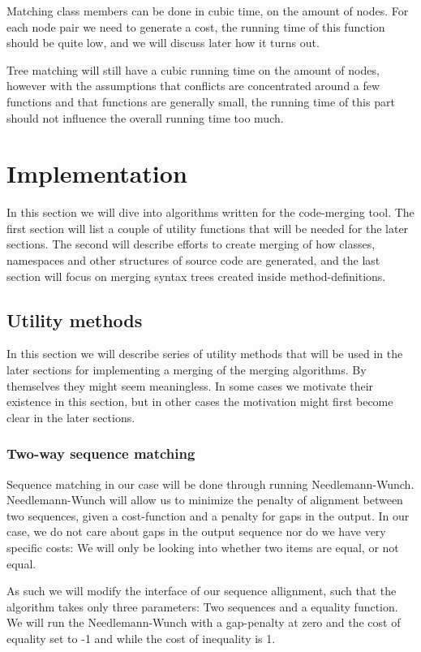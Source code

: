 \documentclass[11pt]{article}
\begin{document}
Matching class members can be done in cubic time, on the amount of nodes. For each node pair we need to generate a cost, the running time of this function should be quite low, and we will discuss later how it turns out. 

Tree matching will still have a cubic running time on the amount of nodes, however with the assumptions that conflicts are concentrated around a few functions and that functions are generally small, the running time of this part should not influence the overall running time too much.

\clearpage

\section{Implementation}
In this section we will dive into algorithms written for the code-merging tool. The first section will list a couple of utility functions that will be needed for the later sections. The second will describe efforts to create merging of how classes, namespaces and other structures of source code are generated, and the last section will focus on merging syntax trees created inside method-definitions.

\subsection{Utility methods}
In this section we will describe series of utility methods that will be used in the later sections for implementing a merging of the merging algorithms. By themselves they might seem meaningless. In some cases we motivate their existence in this section, but in other cases the motivation might first become clear in the later sections.

\subsubsection{Two-way sequence matching}
Sequence matching in our case will be done through running Needlemann-Wunch. Needlemann-Wunch will allow us to minimize the penalty of alignment between two sequences, given a cost-function and a penalty for gaps in the output. In our case, we do not care about gaps in the output sequence nor do we have very specific costs: We will only be looking into whether two items are equal, or not equal.

As such we will modify the interface of our sequence allignment, such that the algorithm takes only three parameters: Two sequences and a equality function. We will run the Needlemann-Wunch with a gap-penalty at zero and the cost of equality set to -1 and while the cost of inequality is 1.
\end{document}
